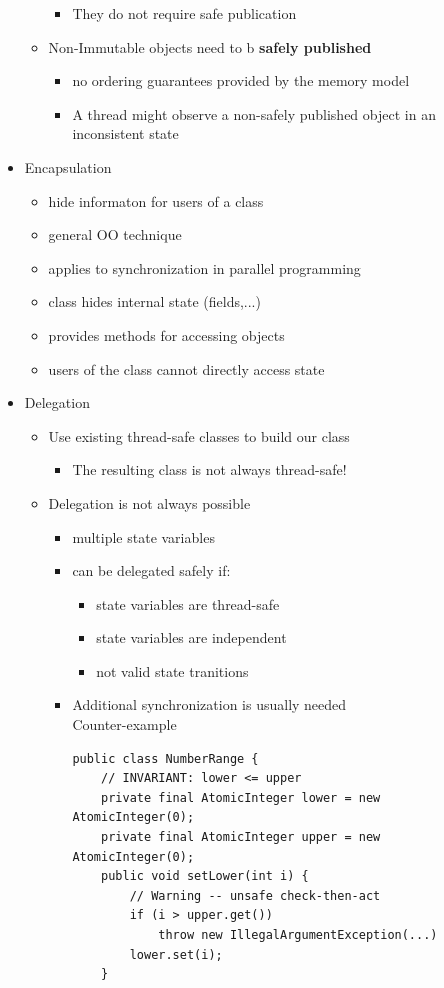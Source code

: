 \documentclass[a4paper]{article}
\begin{document}
\begin{itemize}
\begin{itemize}
\begin{itemize}
						\item They do not require safe publication
					\end{itemize}
				\item Non-Immutable objects need to b \textbf{safely published}
					\begin{itemize}
						\item no ordering guarantees provided by the memory model
						\item A thread might observe a non-safely published object in an inconsistent state
					\end{itemize}
			\end{itemize}
		\item Encapsulation
			\begin{itemize}
				\item hide informaton for users of a class
				\item general OO technique
				\item applies to synchronization in parallel programming
				\item class hides internal state (fields,...)
				\item provides methods for accessing objects
				\item users of the class cannot directly access state
			\end{itemize}
		\item Delegation
			\begin{itemize}
				\item Use existing thread-safe classes to build our class
					\begin{itemize}
						\item The resulting class is not always thread-safe!
					\end{itemize}
				\item Delegation is not always possible
					\begin{itemize}
						\item multiple state variables
						\item can be delegated safely if:
							\begin{itemize}
								\item state variables are thread-safe
								\item state variables are independent
								\item not valid state tranitions
							\end{itemize}
						\item Additional synchronization is usually needed
						\\Counter-example
						\begin{lstlisting}
public class NumberRange {
	// INVARIANT: lower <= upper
	private final AtomicInteger lower = new AtomicInteger(0);
	private final AtomicInteger upper = new AtomicInteger(0);
	public void setLower(int i) {
		// Warning -- unsafe check-then-act
		if (i > upper.get())
			throw new IllegalArgumentException(...)
		lower.set(i);
	}
	

\end{lstlisting}
\end{itemize}
\end{itemize}
\end{itemize}
\end{document}
